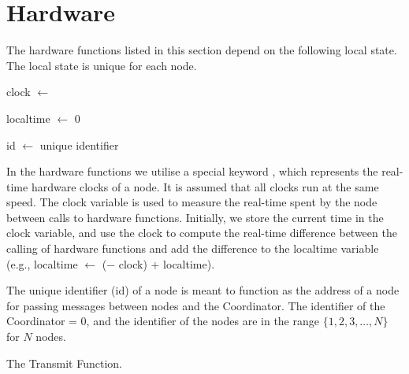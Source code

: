 \section{Hardware}\label{sec:hwfuncspseudo}
The hardware functions listed in this section depend on the following local state. The local state is unique
for each node.\smallbreak

clock $\leftarrow$ \KwNow

localtime $\leftarrow$ 0

id $\leftarrow$ unique identifier \smallbreak

In the hardware functions we utilise a special keyword \KwNow, which represents the real-time hardware clocks
of a node. It is assumed that all clocks run at the same speed. The clock variable is used to measure the
real-time spent by the node between calls to hardware functions. Initially, we store the current time in the
clock variable, and use the clock to compute the real-time difference between the calling of hardware
functions and add the difference to the localtime variable (e.g., localtime $\leftarrow$ (\KwNow $-$ clock)
$+$ localtime).

The unique identifier (id) of a node is meant to function as the address of a node for passing messages
between nodes and the Coordinator. The identifier of the Coordinator = $0$, and the identifier of the nodes
are in the range $\{ 1, 2, 3, \ldots, N \}$ for $N$ nodes.



\begin{algorithm}[ht]
    \DontPrintSemicolon
    

    \caption{The Transmit Function.}
    \label{algo:hwfuncstransmit}
\end{algorithm}

